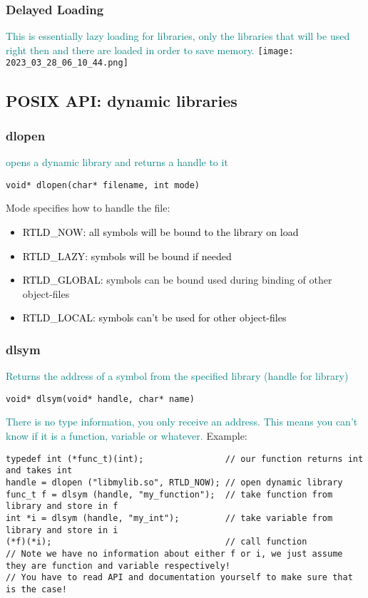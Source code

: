 \documentclass[main.tex,fontsize=8pt,paper=a4,paper=portrait,DIV=calc,]{scrartcl}
\begin{document}
\subsubsection{Delayed Loading}
\textcolor{teal}{This is essentially lazy loading for libraries, only the libraries that will be used right then and there are loaded in order to save memory.}
\texttt{[image: 2023\_03\_28\_06\_10\_44.png]}

\subsection{POSIX API: dynamic libraries}
\subsubsection{dlopen}
\textcolor{teal}{opens a dynamic library and returns a handle to it}
\begin{lstlisting}
void* dlopen(char* filename, int mode)
\end{lstlisting}
Mode specifies how to handle the file:
\begin{itemize}
\item \textcolor{black}{RTLD\_NOW: all symbols will be bound to the library on load}
\item \textcolor{black}{RTLD\_LAZY: symbols will be bound if needed}
\item \textcolor{black}{RTLD\_GLOBAL: } symbols can be bound used during binding of other object-files
\item \textcolor{black}{RTLD\_LOCAL: symbols can't be used for other object-files}
\end{itemize} 

\subsubsection{dlsym}
\textcolor{teal}{Returns the address of a symbol from the specified library (handle for library)}
\begin{lstlisting}
void* dlsym(void* handle, char* name)
\end{lstlisting}
\textcolor{teal}{There is no type information, you only receive an address.\newline
This means you can't know if it is a function, variable or whatever.}\newline
Example:
\begin{lstlisting}
typedef int (*func_t)(int);                // our function returns int and takes int
handle = dlopen ("libmylib.so", RTLD_NOW); // open dynamic library
func_t f = dlsym (handle, "my_function");  // take function from library and store in f
int *i = dlsym (handle, "my_int");         // take variable from library and store in i
(*f)(*i);                                  // call function
// Note we have no information about either f or i, we just assume they are function and variable respectively!
// You have to read API and documentation yourself to make sure that is the case!
\end{lstlisting}
\end{document}
